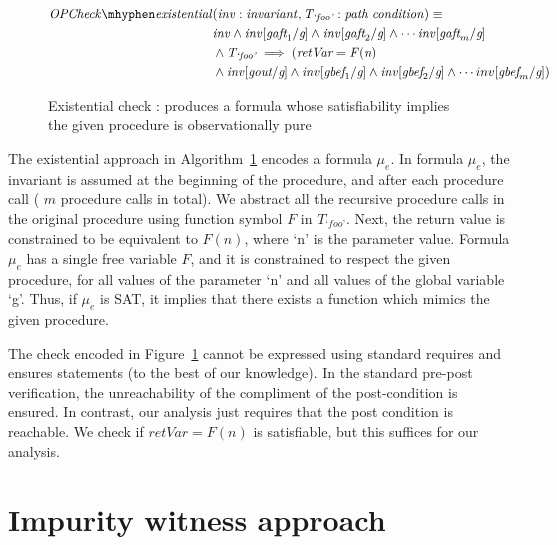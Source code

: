 \documentclass{llncs}
\newcommand{\foo}{\textit{`foo'}}
\newcommand{\inv}{\mathit{inv}}
\newcommand{\pathCondition}{\mathit{T_{\foo}}}
\newcommand{\OPCheckE}{\mathit{OPCheck \mhyphen existential}}
\newcommand{\mi}[1]{\mathit{#1}}
\newcommand{\retVar}{\textit{retVar}}
\newcommand{\F}{\mathit{F}}
\newcommand{\n}{\textit{n}}
\newcommand{\g}{\textit{g}}
\newcommand{\gout}{\textit{gout}}
\newcommand{\gbef}{\textit{gbef}}
\newcommand{\gaft}{\textit{gaft}}
\newcommand{\formula}{\mu}
\begin{document}
\begin{figure}[htp]
  \begin{algorithm}[H]
    \begin{align*}
      \OPCheckE
       & \mi{(\inv :
        invariant, \pathCondition : path \; condition)} \equiv \\
      &\inv \wedge \inv[\gaft_1/\g] \wedge \inv[\gaft_2/\g] \wedge
      \cdots \inv[\gaft_m/\g] \\
      &\wedge \pathCondition \implies ( \retVar = \F(\n)\\
            & \wedge \inv[\gout/\g] \wedge  \inv[\gbef_1/\g] \wedge
      \inv[\gbef_2/\g] \wedge \cdots inv[\gbef_m/\g]) \\
    \end{align*}
    \caption{Existential check : produces a formula whose
      satisfiability implies the given procedure is observationally
      pure} 
    \label{algo:someOPcheckCombined}
  \end{algorithm}  
\end{figure}

The existential approach in Algorithm~\ref{algo:someOPcheckCombined}
encodes a formula $\formula_e$. In formula $\formula_e$, the invariant
is assumed at the beginning of the procedure, and after each procedure
call ( $m$ procedure calls in total).  We abstract all the recursive
procedure calls in the original procedure using function symbol $\F$
in $\pathCondition$.  Next, the return value is constrained to be
equivalent to $\F(n)$, where `n' is the parameter value. Formula
$\formula_e$ has a single free variable $\F$, and it is constrained to
respect the given procedure, for all values of the parameter `n' and
all values of the global variable `g'. Thus, if $\formula_e$ is SAT,
it implies that there exists a function which mimics the given
procedure. 

The check encoded in Figure~\ref{algo:someOPcheckCombined} cannot be
expressed using standard requires and ensures statements (to the best
of our knowledge). In the standard pre-post verification, the
unreachability of the compliment of the post-condition is ensured. In
contrast, our analysis just requires that the post condition is
reachable. We check if $\retVar = \F(n)$ is satisfiable, but this
suffices for our analysis.

\section{Impurity witness approach}\label{sec:impurityWitness}
\end{document}
